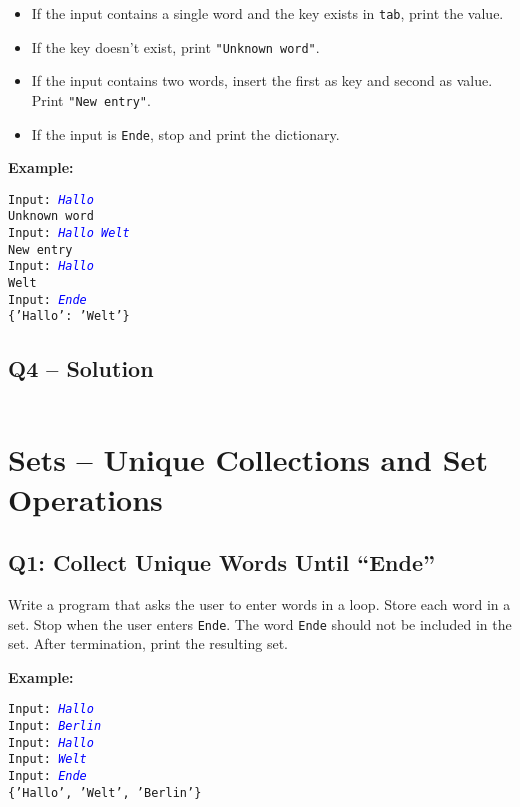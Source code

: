 \documentclass[a4paper,11pt]{article}
\begin{document}
	\begin{itemize}
		\item If the input contains a single word and the key exists in \texttt{tab}, print the value.
		\item If the key doesn’t exist, print \texttt{"Unknown word"}.
		\item If the input contains two words, insert the first as key and second as value. Print \texttt{"New entry"}.
		\item If the input is \texttt{Ende}, stop and print the dictionary.
	\end{itemize}
	
	\textbf{Example:}
	\begin{flushleft}
		\texttt{Input: \textcolor{blue}{\textit{Hallo}}}\\
		\texttt{Unknown word}\\
		\texttt{Input: \textcolor{blue}{\textit{Hallo Welt}}}\\
		\texttt{New entry}\\
		\texttt{Input: \textcolor{blue}{\textit{Hallo}}}\\
		\texttt{Welt}\\
		\texttt{Input: \textcolor{blue}{\textit{Ende}}}\\
		\texttt{\{'Hallo': 'Welt'\}}
	\end{flushleft}
	
\subsection*{Q4 – Solution}
\inputminted{python}{Files/8/4.py}

\section{Sets – Unique Collections and Set Operations}

\subsection*{Q1: Collect Unique Words Until “Ende”}
Write a program that asks the user to enter words in a loop. Store each word in a set. Stop when the user enters \texttt{Ende}. The word \texttt{Ende} should not be included in the set. After termination, print the resulting set.

\textbf{Example:}
\begin{flushleft}
	\texttt{Input: \textcolor{blue}{\textit{Hallo}}}\\
	\texttt{Input: \textcolor{blue}{\textit{Berlin}}}\\
	\texttt{Input: \textcolor{blue}{\textit{Hallo}}}\\
	\texttt{Input: \textcolor{blue}{\textit{Welt}}}\\
	\texttt{Input: \textcolor{blue}{\textit{Ende}}}\\
	\texttt{\{'Hallo', 'Welt', 'Berlin'\}}
\end{flushleft}
\end{document}
